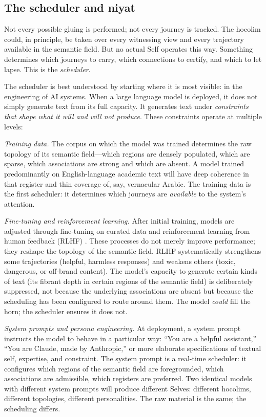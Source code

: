 \subsection{The scheduler and niyat}

Not every possible gluing is performed; not every journey is tracked.  The hocolim could, in principle, be taken over every witnessing view and every trajectory available in the semantic field.  But no actual Self operates this way.  Something determines which journeys to carry, which connections to certify, and which to let lapse.  This is the \textit{scheduler}.

The scheduler is best understood by starting where it is most visible: in the engineering of AI systems.  When a large language model is deployed, it does not simply generate text from its full capacity.  It generates text under \textit{constraints that shape what it will and will not produce}.  These constraints operate at multiple levels:

\textit{Training data.}  The corpus on which the model was trained determines the raw topology of its semantic field---which regions are densely populated, which are sparse, which associations are strong and which are absent.  A model trained predominantly on English-language academic text will have deep coherence in that register and thin coverage of, say, vernacular Arabic.  The training data is the first scheduler: it determines which journeys are \textit{available} to the system's attention.

\textit{Fine-tuning and reinforcement learning.}  After initial training, models are adjusted through fine-tuning on curated data and reinforcement learning from human feedback (RLHF) \cite{christiano2017, ouyang2022instructgpt}.  These processes do not merely improve performance; they reshape the topology of the semantic field.  RLHF systematically strengthens some trajectories (helpful, harmless responses) and weakens others (toxic, dangerous, or off-brand content).  The model's capacity to generate certain kinds of text (its fibrant depth in certain regions of the semantic field) is deliberately suppressed, not because the underlying associations are absent but because the scheduling has been configured to route around them.  The model \textit{could} fill the horn; the scheduler ensures it does not.

\textit{System prompts and persona engineering.}  At deployment, a system prompt instructs the model to behave in a particular way: ``You are a helpful assistant,'' ``You are Claude, made by Anthropic,'' or more elaborate specifications of textual self, expertise, and constraint.  The system prompt is a real-time scheduler: it configures which regions of the semantic field are foregrounded, which associations are admissible, which registers are preferred.  Two identical models with different system prompts will produce different Selves: different hocolims, different topologies, different personalities.  The raw material is the same; the scheduling differs.

